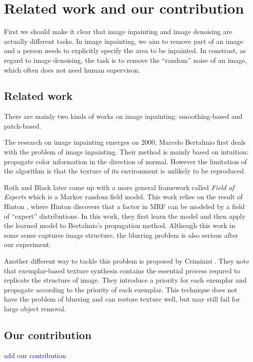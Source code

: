 \section{Related work and our contribution}
First we should make it clear that image inpainting and image denoising are
actually different tasks. In image inpainting, we aim to remove part of 
an image and a person needs to explicitly specify the area to be inpainted.
In constrast, as regard to image denoising, the task is to remove the 
``random'' noise of an image, which often does not need human supervison.
\subsection{Related work}
There are mainly two kinds of works on image inpainting: smoothing-based and
patch-based.

The research on image inpainting emerges on 2000, Marcelo Bertalmio \etal
\cite{siggraph00} first deals with the problem of image inpainting. Their
method is mainly based on intuition: propagate color information in the
direction of normal. However the limitation of the algorithm is that the
texture of its environment is unlikely to be reproduced.

Roth and Black \cite{cvpr05} later come up with a more general framework 
called \emph{Field of Experts} which is a Markov random field model. This
work relies on the result of Hinton \cite{neco02}, where Hinton discovers
that a factor in MRF can be modeled by a field of ``expert'' distributions.
In this work, they first learn the model and then apply the learned model
to Bertalmio's propagation method. Although this work in some sense captures
image structure, the blurring problem is also serious after our experiment.

Another different way to tackle this problem is proposed by Criminisi \etal
 \cite{cvpr03,tip04}. They note that exemplar-based texture synthesis
 contains the essential process requred to replicate the structure of image.
 They introduce a priority for each exemplar and propagate according to
 the priority of each exemplar. This technique does not have the problem
 of blurring and can restore texture well, but may still fail for large
 object removal.

\subsection{Our contribution}
\textcolor{blue}{add our contribution}
